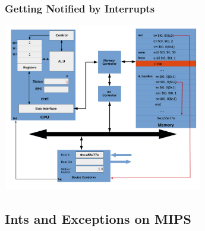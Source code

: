 \documentclass{beamer}
\begin{document}
\begin{frame}[fragile]
\frametitle{Getting Notified by Interrupts}

\begin{center}
\vspace*{-0.23cm}
\hspace*{-1cm}\includegraphics[width=8.7cm]{interrupt_waiting26.pdf}
\end{center}

\end{frame}

\subsection{Ints and Exceptions on MIPS}
\end{document}
